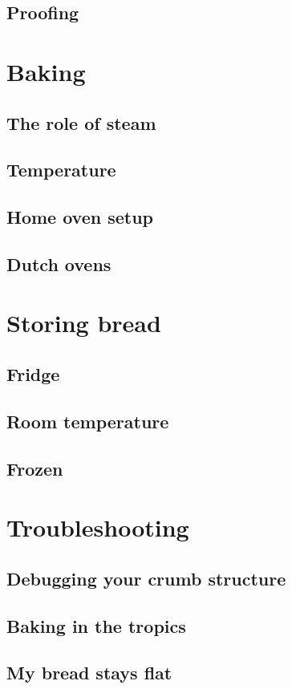\documentclass[a4paper, 12pt]{book}
\begin{document}
\section{Proofing}

\chapter{Baking}
\section{The role of steam}
\section{Temperature}
\section{Home oven setup}
\section{Dutch ovens}

\chapter{Storing bread}
\section{Fridge}
\section{Room temperature}
\section{Frozen}

\chapter{Troubleshooting}
\section{Debugging your crumb structure}
\section{Baking in the tropics}
\section{My bread stays flat}
\end{document}
